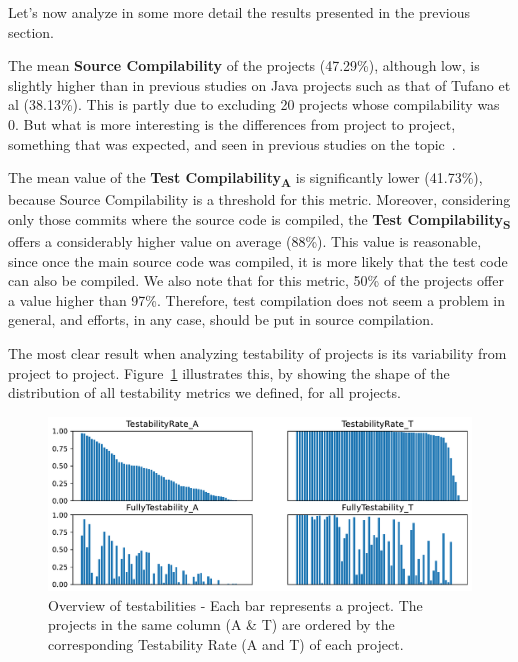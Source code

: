 Let's now analyze in some more detail the results presented in the previous section.

The mean \textbf{Source Compilability} of the projects (47.29\%), although low, is slightly higher than in previous studies on Java projects such as that of Tufano et al (38.13\%). 
This is partly due to excluding 20 projects whose compilability was 0.
But what is more interesting is the differences from project to project, something that was expected, and seen in previous studies on the topic~\cite{tufano2017there,sulir2020large,querel:2021:warning}.

The mean value of the \textbf{Test Compilability\textsubscript{A}} is significantly lower (41.73\%), because Source Compilability is a threshold for this metric.
Moreover, considering only those commits where the source code is compiled, the \textbf{Test Compilability\textsubscript{S}} offers a considerably higher value on average (88\%).
This value is reasonable, since once the main source code was compiled, it is more likely that the test code can also be compiled. 
We also note that for this metric, 50\% of the projects offer a value higher than 97\%.
Therefore, test compilation does not seem a problem in general, and efforts, in any case, should be put in source compilation.



The most clear result when analyzing testability of projects is its variability from project to project. 
Figure~\ref{fig:testability-overview} illustrates this, by showing the shape of the distribution of all testability metrics we defined, for all projects.

\begin{figure}[ht!]
    \centering    
    \includegraphics[width=\textwidth]{pages/02-Testability/images/Overview.pdf}
    \caption{Overview of testabilities - Each bar represents a project. The projects in the same column (A \& T) are ordered by the corresponding Testability Rate (A and T) of each project.}
    \label{fig:testability-overview}
\end{figure}

